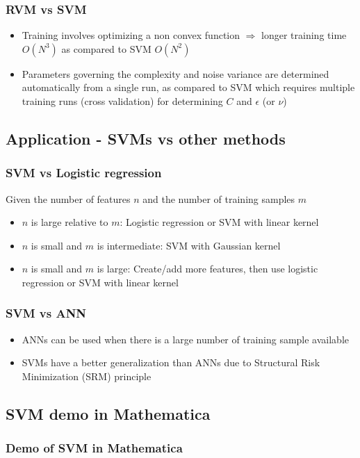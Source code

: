 \documentclass[t,14pt]{beamer}
\begin{document}
\begin{frame}
  \frametitle{RVM vs SVM}
  \begin{itemize}
    \item {
            Training involves optimizing a non convex function 
            $\Rightarrow$ 
            longer training time $O(N^3)$ as compared to SVM $O(N^2)$
          }
    \item {
            Parameters governing the complexity and noise variance are 
            determined automatically from a single run, as compared to SVM 
            which requires multiple training runs (cross validation) for 
            determining $C$ and $\epsilon$ (or $\nu$)
          }
  \end{itemize}
\end{frame}

\subsection{Application - SVMs vs other methods}

\begin{frame}
  \frametitle{SVM vs Logistic regression}
  Given the number of features $n$ and the number of training samples $m$
  \begin{itemize}
    \item {
            $n$ is large relative to $m$: Logistic regression or SVM with linear 
            kernel 
          }
    \item {$n$ is small and $m$ is intermediate: SVM with Gaussian kernel}
    \item {
            $n$ is small and $m$ is large: Create/add more features, then use 
            logistic regression or SVM with linear kernel
          }
  \end{itemize}
\end{frame}

\begin{frame}
  \frametitle{SVM vs ANN}
  \begin{itemize}
    \item { 
            ANNs can be used when there is a large number of training sample 
            available
          }
    \item {
            SVMs have a better generalization than ANNs due to Structural Risk
            Minimization (SRM) principle
          }
  \end{itemize}
\end{frame}

\subsection{SVM demo in Mathematica}
\begin{frame}
  \frametitle{Demo of SVM in Mathematica}
\end{frame}
\end{document}
